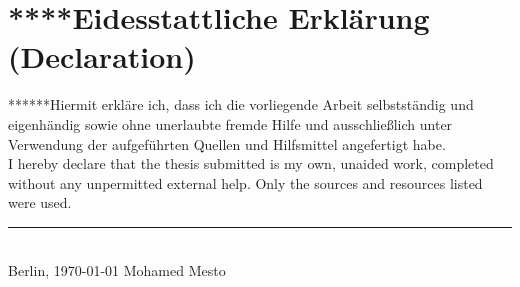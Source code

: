 \chapter*{****Eidesstattliche Erklärung (Declaration)}

\thispagestyle{empty}
******Hiermit erkläre ich,  dass  ich  die  vorliegende  Arbeit  selbstständig  und  eigenhändig  sowie  ohne unerlaubte  fremde  Hilfe  und  ausschließlich  unter  Verwendung  der  aufgeführten  Quellen  und Hilfsmittel angefertigt habe.\\

I hereby  declare  that  the  thesis submitted  is  my  own,  unaided work,  completed  without  any unpermitted external help. Only the sources and resources listed were used.\\

\vspace{10 mm}
\begin{flushright}
    \rule{95mm}{1pt}\\
    Berlin, \today \hspace{15 mm} Mohamed Mesto
\end{flushright}